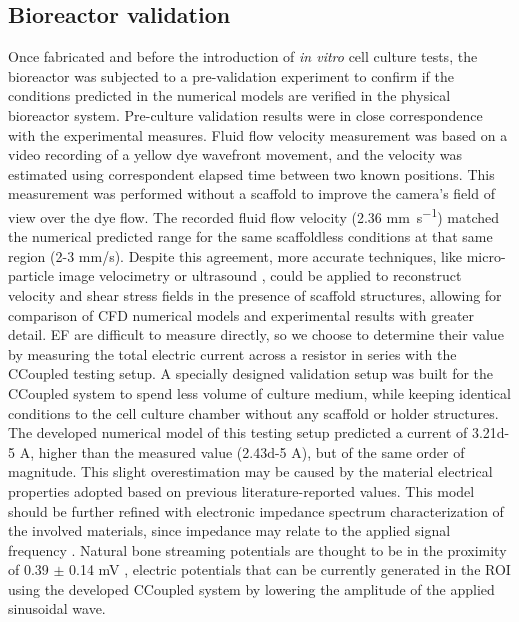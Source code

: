 \subsection{Bioreactor validation}
Once fabricated and before the introduction of \textit{in vitro} cell culture tests, the bioreactor was subjected to a pre-validation experiment to confirm if the conditions predicted in the numerical models are verified in the physical bioreactor system. Pre-culture validation results were in close correspondence with the experimental measures. Fluid flow velocity measurement was based on a video recording of a yellow dye wavefront movement, and the velocity was estimated using correspondent elapsed time between two known positions. This measurement was performed without a scaffold to improve the camera's field of view over the dye flow. The recorded fluid flow velocity (2.36 \si{\milli\meter\per\second}) matched the numerical predicted range for the same scaffoldless conditions at that same region (2-3 mm/s). Despite this agreement, more accurate techniques, like micro-particle image velocimetry \cite{Guastamacchia2022-bf} or ultrasound \cite{Smith2018-he}, could be applied to reconstruct velocity and shear stress fields in the presence of scaffold structures, allowing for comparison of CFD numerical models and experimental results with greater detail. \acs{EF} are difficult to measure directly, so we choose to determine their value by measuring the total electric current across a resistor in series with the CCoupled testing setup. A specially designed validation setup was built for the CCoupled system to spend less volume of culture medium, while keeping identical conditions to the cell culture chamber without any scaffold or holder structures. The developed numerical model of this testing setup predicted a current of \num{3.21d-5} \unit{\ampere}, higher than the measured value (\num{2.43d-5} \unit{\ampere}), but of the same order of magnitude. This slight overestimation may be caused by the material electrical properties adopted based on previous literature-reported values. This model should be further refined with electronic impedance spectrum characterization of the involved materials, since impedance may relate to the applied signal frequency \cite{10261_305757}. Natural bone streaming potentials are thought to be in the proximity of \num{0.39} $\pm$ \num{0.14} \si{\milli\volt} \cite{Qin2002-bn}, electric potentials that can be currently generated in the ROI using the developed CCoupled system by lowering the amplitude of the applied sinusoidal wave.

